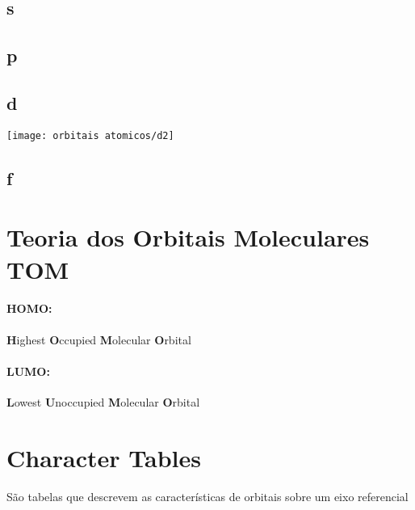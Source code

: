 \documentclass{article}
\begin{document}
\begin{multicols}{2}

\subsection{s}
\label{oa s}

\subsection{p}
\label{oa p}

\subsection{d}
\label{oa d}

\begin{tcolorbox}

\texttt{[image: orbitais atomicos/d2]}

\end{tcolorbox}

\subsection{f}
\label{oa f}

\end{multicols}

\section{Teoria dos Orbitais Moleculares TOM}
\label{tom}

\begin{multicols}{2}

	\paragraph{HOMO:} \hspace{-2mm}%
	\textbf{H}ighest
	\textbf{O}ccupied
	\textbf{M}olecular
	\textbf{O}rbital%
%
\\	\paragraph{LUMO:} \hspace{-2mm}%
	\textbf{L}owest
	\textbf{U}noccupied
	\textbf{M}olecular
	\textbf{O}rbital%

\end{multicols}


\section{Character Tables}
%
São tabelas que descrevem as características de orbitais sobre um eixo referencial
%
\end{document}
